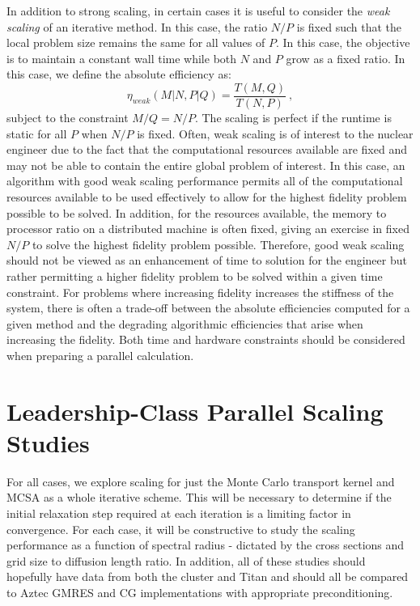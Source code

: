 In addition to strong scaling, in certain cases it is useful to
consider the \textit{weak scaling} of an iterative method. In this
case, the ratio $N/P$ is fixed such that the local problem size
remains the same for all values of $P$. In this case, the objective is
to maintain a constant wall time while both $N$ and $P$ grow as a
fixed ratio. In this case, we define the absolute efficiency as:
\begin{equation}
  \eta_{weak}(M|N,P|Q) = \frac{T(M,Q)}{T(N,P)}\:,
  \label{eq:weak_scaling_absolute}
\end{equation}
subject to the constraint $M/Q = N/P$. The scaling is perfect if the
runtime is static for all $P$ when $N/P$ is fixed. Often, weak scaling
is of interest to the nuclear engineer due to the fact that the
computational resources available are fixed and may not be able to
contain the entire global problem of interest. In this case, an
algorithm with good weak scaling performance permits all of the
computational resources available to be used effectively to allow for
the highest fidelity problem possible to be solved. In addition, for
the resources available, the memory to processor ratio on a
distributed machine is often fixed, giving an exercise in fixed $N/P$
to solve the highest fidelity problem possible. Therefore, good weak
scaling should not be viewed as an enhancement of time to solution for
the engineer but rather permitting a higher fidelity problem to be
solved within a given time constraint. For problems where increasing
fidelity increases the stiffness of the system, there is often a
trade-off between the absolute efficiencies computed for a given
method and the degrading algorithmic efficiencies that arise when
increasing the fidelity. Both time and hardware constraints should be
considered when preparing a parallel calculation.

\section{Leadership-Class Parallel Scaling Studies\ }
\label{sec:leadership_scaling_studies}
For all cases, we explore scaling for just the Monte Carlo transport
kernel and MCSA as a whole iterative scheme. This will be necessary to
determine if the initial relaxation step required at each iteration is
a limiting factor in convergence. For each case, it will be
constructive to study the scaling performance as a function of
spectral radius - dictated by the cross sections and grid size to
diffusion length ratio. In addition, all of these studies should
hopefully have data from both the cluster and Titan and should all be
compared to Aztec GMRES and CG implementations with appropriate
preconditioning.


